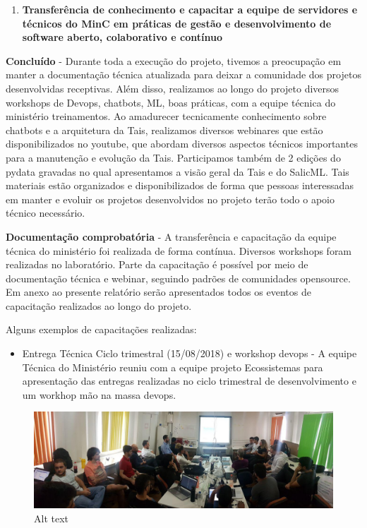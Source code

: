\begin{enumerate}
\def\labelenumi{\arabic{enumi}.}
\setcounter{enumi}{3}
\tightlist
\item
  \textbf{Transferência de conhecimento e capacitar a equipe de
  servidores e técnicos do MinC em práticas de gestão e desenvolvimento
  de software aberto, colaborativo e contínuo}
\end{enumerate}

\textbf{Concluído} - Durante toda a execução do projeto, tivemos a
preocupação em manter a documentação técnica atualizada para deixar a
comunidade dos projetos desenvolvidas receptivas. Além disso, realizamos
ao longo do projeto diversos workshops de Devops, chatbots, ML, boas
práticas, com a equipe técnica do ministério treinamentos. Ao amadurecer
tecnicamente conhecimento sobre chatbots e a arquitetura da Tais,
realizamos diversos webinares que estão disponibilizados no youtube, que
abordam diversos aspectos técnicos importantes para a manutenção e
evolução da Tais. Participamos também de 2 edições do pydata gravadas no
qual apresentamos a visão geral da Tais e do SalicML. Tais materiais
estão organizados e disponibilizados de forma que pessoas interessadas
em manter e evoluir os projetos desenvolvidos no projeto terão todo o
apoio técnico necessário.

\textbf{Documentação comprobatória} - A transferência e capacitação da
equipe técnica do ministério foi realizada de forma contínua. Diversos
workshops foram realizadas no laboratório. Parte da capacitação é
possível por meio de documentação técnica e webinar, seguindo padrões de
comunidades opensource. Em anexo ao presente relatório serão
apresentados todos os eventos de capacitação realizados ao longo do
projeto.

Alguns exemplos de capacitações realizadas:

\begin{itemize}
\tightlist
\item
  Entrega Técnica Ciclo trimestral (15/08/2018) e workshop devops - A
  equipe Técnica do Ministério reuniu com a equipe projeto Ecossistemas
  para apresentação das entregas realizadas no ciclo trimestral de
  desenvolvimento e um workhop mão na massa devops.
\end{itemize}

\begin{figure}
\centering
\includegraphics{figs/entrega1.jpg}
\caption{Alt text}
\end{figure}

